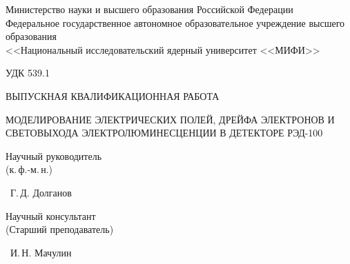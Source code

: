 \documentclass[12pt]{article}
\begin{document}

\begin{titlepage}
  \begin{center}
    \begin{scshape}
      Министерство науки и высшего образования Российской Федерации\\
      \smallskip
      Федеральное государственное автономное образовательное учреждение
      высшего образования\\
      <<Национальный исследовательский ядерный университет <<МИФИ>>
    \end{scshape}

    \vspace{1\baselineskip}
    \begin{flushleft}
      УДК 539.1
    \end{flushleft}

    \Large
    \vspace{2\baselineskip}

    \MakeTextUppercase{Выпускная квалификационная работа}\\[0.5\baselineskip]
    \begin{bfseries}
      \MakeTextUppercase{Моделирование электрических полей, дрейфа электронов
      и световыхода электролюминесценции в детекторе РЭД-100}
    \end{bfseries}

    \normalsize
    \vspace{2\baselineskip}

    \begin{minipage}[b][2\baselineskip][b]{0.4\linewidth}
      Научный руководитель\\
      (к.\,ф.-м.\,н.)
    \end{minipage}
    \hfill
    \begin{minipage}[b][2\baselineskip][b]{0.4\linewidth}
      \underline{\hspace{2cm}}~Г.\,Д. Долганов
    \end{minipage}

    \begin{minipage}[b][2\baselineskip][b]{0.4\linewidth}
      Научный консультант\\
      (Старший преподаватель)
    \end{minipage}
    \hfill
    \begin{minipage}[b][2\baselineskip][b]{0.4\linewidth}
      \underline{\hspace{2cm}}~И.\,Н. Мачулин
    \end{minipage}


\end{center}
\end{titlepage}
\end{document}

